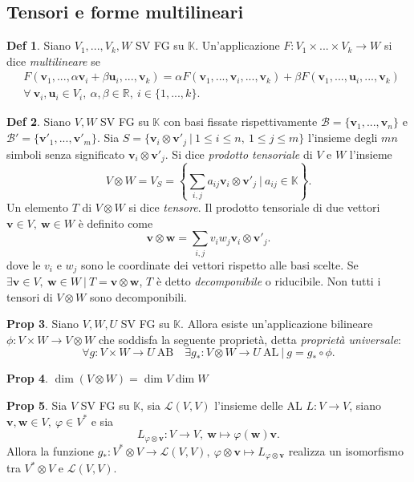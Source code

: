 \documentclass[]{article}
\newcommand{\vu}{\mathbf{u}}
\newcommand{\vv}{\mathbf{v}}
\newcommand{\vw}{\mathbf{w}}
\theoremstyle{definition}
\theoremstyle{definition}
\newtheorem{prop}{Prop}[subsection]
\theoremstyle{definition}
\newtheorem{dfn}[prop]{Def}
\begin{document}
\subsection{Tensori e forme multilineari}

 \begin{dfn} Siano $V_1 ,..., V_k , W$ SV FG su $\mathbb{K}$. Un'applicazione $F:V_1 \times ... \times V_k \to W$ si dice \emph{multilineare} se 
\begin{align*}
&F( \vv _1 ,..., \alpha \vv _i + \beta \vu _i ,..., \vv _k ) = \alpha F( \vv _1 ,..., \vv _i ,..., \vv _k )+ \beta F( \vv _1 ,..., \vu _i ,..., \vv _k )\ \\ &\forall \ \vv _i , \vu _i \in V_i , \ \alpha , \beta \in \mathbb{R}, \ i \in \{ 1,...,k \}.
\end{align*}

 \end{dfn}  \begin{dfn} Siano $V,W$ SV FG su $\mathbb{K}$ con basi fissate rispettivamente $\mathcal{B}=\{ \vv _1 , ... , \vv _n \}$ e $\mathcal{B'}=\{ \vv ' _1 , ... , \vv ' _m \}$. Sia $S=\{\vv_i \otimes \vv'_j \ | \ 1 \leq i \leq n,\ 1 \leq j \leq m\}$ l'insieme degli $mn$ simboli senza significato $\vv_i \otimes \vv'_j$. Si dice \emph{prodotto tensoriale} di $V$ e $W$ l'insieme
$$V \otimes W = V_S = \left\lbrace \sum_{i,j} a_{ij}\vv_i \otimes \vv'_j \ | \ a_{ij} \in \mathbb{K} \right\rbrace.$$
Un elemento $T$ di $V \otimes W$ si dice \emph{tensore}. Il prodotto tensoriale di due vettori $\vv \in V,\ \vw \in W$ è definito come
$$\vv \otimes \vw = \sum_{i,j} v_i w_j \vv_i \otimes \vv'_j .$$
dove le $v_i$ e $w_j$ sono le coordinate dei vettori rispetto alle basi scelte. Se $\exists \vv \in V,\ \vw \in W \ | \ T=\vv \otimes \vw$, $T$ è detto \emph{decomponibile} o riducibile. Non tutti i tensori di $V \otimes W$ sono decomponibili.

 \end{dfn} \begin{prop} Siano $V,W,U$ SV FG su $\mathbb{K}$. Allora esiste un'applicazione bilineare $\phi:V \times W \to V \otimes W$ che soddisfa la seguente proprietà, detta \emph{proprietà universale}: 
$$\forall g:V \times W \to U\ \mathrm{AB}\quad \exists g_*:V \otimes W \to U\ \mathrm{AL}\ | \ g=g_* \circ \phi.$$

\end{prop} \begin{prop} $\dim(V \otimes W)= \dim V \dim W$

\end{prop} \begin{prop} Sia $V$ SV FG su $\mathbb{K}$, sia $\mathcal{L}(V,V)$ l'insieme delle AL $L:V \to V$, siano $\vv,\vw \in V,\ \varphi \in V^*$ e sia 
$$L_{\varphi \otimes \vv}:V \to V,\ \vw \mapsto \varphi(\vw)\vv.$$ 
Allora la funzione $g_*:V^* \otimes V \to \mathcal{L}(V,V),\ \varphi \otimes \vv \mapsto L_{\varphi \otimes \vv}$ realizza un isomorfismo tra $V^* \otimes V$ e $\mathcal{L}(V,V)$.


\end{prop}
\end{document}
